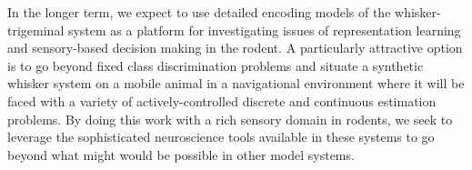 In the longer term, we expect to use detailed encoding models of the whisker-trigeminal system as a platform for investigating issues of representation learning and sensory-based decision making in the rodent. 
A particularly attractive option is to go beyond fixed class discrimination problems and situate a synthetic whisker system on a mobile animal in a navigational environment where it will be faced with a variety of actively-controlled discrete and continuous estimation problems.
By doing this work with a rich sensory domain in rodents, we seek to leverage the sophisticated neuroscience tools available in these systems to go beyond what might would be possible in other model systems.  

